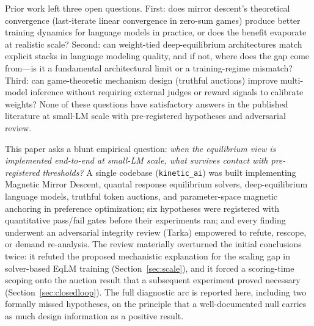 Prior work left three open questions. First: does mirror descent's theoretical convergence (last-iterate linear convergence in zero-sum games) produce better training dynamics for language models in practice, or does the benefit evaporate at realistic scale? Second: can weight-tied deep-equilibrium architectures match explicit stacks in language modeling quality, and if not, where does the gap come from---is it a fundamental architectural limit or a training-regime mismatch? Third: can game-theoretic mechanism design (truthful auctions) improve multi-model inference without requiring external judges or reward signals to calibrate weights? None of these questions have satisfactory answers in the published literature at small-LM scale with pre-registered hypotheses and adversarial review.

This paper asks a blunt empirical question: \emph{when the equilibrium view is implemented end-to-end at small-LM scale, what survives contact with pre-registered thresholds?} A single codebase (\texttt{kinetic\_ai}) was built implementing Magnetic Mirror Descent, quantal response equilibrium solvers, deep-equilibrium language models, truthful token auctions, and parameter-space magnetic anchoring in preference optimization; six hypotheses were registered with quantitative pass/fail gates before their experiments ran; and every finding underwent an adversarial integrity review (Tarka) empowered to refute, rescope, or demand re-analysis. The review materially overturned the initial conclusions twice: it refuted the proposed mechanistic explanation for the scaling gap in solver-based EqLM training (Section~\ref{sec:scale}), and it forced a scoring-time scoping onto the auction result that a subsequent experiment proved necessary (Section~\ref{sec:closedloop}). The full diagnostic arc is reported here, including two formally missed hypotheses, on the principle that a well-documented null carries as much design information as a positive result.

